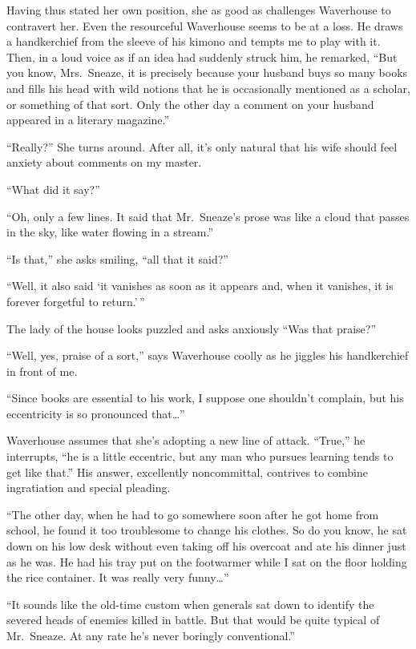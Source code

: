 \documentclass[12pt, openright]{book}
\begin{document}
Having thus stated her own position, she as good as challenges
Waverhouse to contravert her. Even the resourceful Waverhouse seems to
be at a loss. He draws a handkerchief from the sleeve of his kimono and
tempts me to play with it. Then, in a loud voice as if an idea had
suddenly struck him, he remarked, ``But you know, Mrs.~Sneaze, it is
precisely because your husband buys so many books and fills his head
with wild notions that he is occasionally mentioned as a scholar, or
something of that sort. Only the other day a comment on your husband
appeared in a literary magazine.''

``Really?'' She turns around. After all, it's only natural that his wife
should feel anxiety about comments on my master.

``What did it say?''

``Oh, only a few lines. It said that Mr.~Sneaze's prose was like a cloud
that passes in the sky, like water flowing in a stream.''

``Is that,'' she asks smiling, ``all that it said?''

``Well, it also said `it vanishes as soon as it appears and, when it
vanishes, it is forever forgetful to return.'\,''

The lady of the house looks puzzled and asks anxiously ``Was that
praise?''

``Well, yes, praise of a sort,'' says Waverhouse coolly as he jiggles
his handkerchief in front of me.

``Since books are essential to his work, I suppose one shouldn't
complain, but his eccentricity is so pronounced that\ldots{}''

Waverhouse assumes that she's adopting a new line of attack. ``True,''
he interrupts, ``he is a little eccentric, but any man who pursues
learning tends to get like that.'' His answer, excellently noncommittal,
contrives to combine ingratiation and special pleading.

``The other day, when he had to go somewhere soon after he got home from
school, he found it too troublesome to change his clothes. So do you
know, he sat down on his low desk without even taking off his overcoat
and ate his dinner just as he was. He had his tray put on the footwarmer
while I sat on the floor holding the rice container. It was really very
funny\ldots{}''

``It sounds like the old-time custom when generals sat down to identify
the severed heads of enemies killed in battle. But that would be quite
typical of Mr.~Sneaze. At any rate he's never boringly conventional.''
\end{document}
